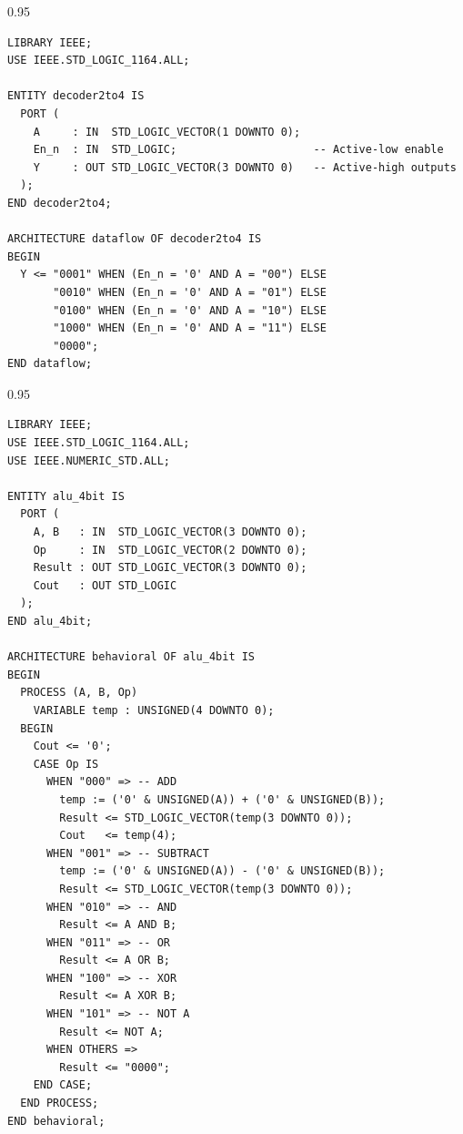 \documentclass[12pt,a4paper]{article}
\begin{document}
\begin{tcolorbox}[examplebox, title={3. 2-to-4 Binary Decoder with Active-Low Enable}]
\begin{spacing}{0.95}
\begin{verbatim}
LIBRARY IEEE;
USE IEEE.STD_LOGIC_1164.ALL;

ENTITY decoder2to4 IS
  PORT (
    A     : IN  STD_LOGIC_VECTOR(1 DOWNTO 0);
    En_n  : IN  STD_LOGIC;                     -- Active-low enable
    Y     : OUT STD_LOGIC_VECTOR(3 DOWNTO 0)   -- Active-high outputs
  );
END decoder2to4;

ARCHITECTURE dataflow OF decoder2to4 IS
BEGIN
  Y <= "0001" WHEN (En_n = '0' AND A = "00") ELSE
       "0010" WHEN (En_n = '0' AND A = "01") ELSE
       "0100" WHEN (En_n = '0' AND A = "10") ELSE
       "1000" WHEN (En_n = '0' AND A = "11") ELSE
       "0000";
END dataflow;
\end{verbatim}
\end{spacing}
\end{tcolorbox}

\begin{tcolorbox}[examplebox, title={4. 4-Bit Arithmetic Logic Unit (ALU)}]
\begin{spacing}{0.95}
\begin{verbatim}
LIBRARY IEEE;
USE IEEE.STD_LOGIC_1164.ALL;
USE IEEE.NUMERIC_STD.ALL;

ENTITY alu_4bit IS
  PORT (
    A, B   : IN  STD_LOGIC_VECTOR(3 DOWNTO 0);
    Op     : IN  STD_LOGIC_VECTOR(2 DOWNTO 0);
    Result : OUT STD_LOGIC_VECTOR(3 DOWNTO 0);
    Cout   : OUT STD_LOGIC
  );
END alu_4bit;

ARCHITECTURE behavioral OF alu_4bit IS
BEGIN
  PROCESS (A, B, Op)
    VARIABLE temp : UNSIGNED(4 DOWNTO 0);
  BEGIN
    Cout <= '0';
    CASE Op IS
      WHEN "000" => -- ADD
        temp := ('0' & UNSIGNED(A)) + ('0' & UNSIGNED(B));
        Result <= STD_LOGIC_VECTOR(temp(3 DOWNTO 0));
        Cout   <= temp(4);
      WHEN "001" => -- SUBTRACT
        temp := ('0' & UNSIGNED(A)) - ('0' & UNSIGNED(B));
        Result <= STD_LOGIC_VECTOR(temp(3 DOWNTO 0));
      WHEN "010" => -- AND
        Result <= A AND B;
      WHEN "011" => -- OR
        Result <= A OR B;
      WHEN "100" => -- XOR
        Result <= A XOR B;
      WHEN "101" => -- NOT A
        Result <= NOT A;
      WHEN OTHERS =>
        Result <= "0000";
    END CASE;
  END PROCESS;
END behavioral;
\end{verbatim}
\end{spacing}
\end{tcolorbox}
\end{document}
